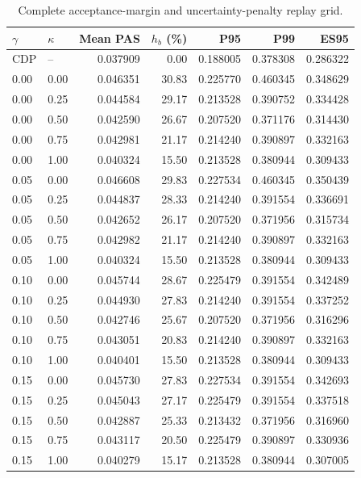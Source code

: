 \begin{table}[!htbp]\centering
\small
\caption{Complete acceptance-margin and uncertainty-penalty replay grid.}\label{tab:reliability_grid}
\begin{tabularx}{\linewidth}{YYrrrrr}\toprule
$\gamma$ & $\kappa$ & Mean PAS & $h_b$ (\%) & P95 & P99 & ES95\\\midrule
CDP & -- & 0.037909 & 0.00 & 0.188005 & 0.378308 & 0.286322\\
0.00 & 0.00 & 0.046351 & 30.83 & 0.225770 & 0.460345 & 0.348629\\
0.00 & 0.25 & 0.044584 & 29.17 & 0.213528 & 0.390752 & 0.334428\\
0.00 & 0.50 & 0.042590 & 26.67 & 0.207520 & 0.371176 & 0.314430\\
0.00 & 0.75 & 0.042981 & 21.17 & 0.214240 & 0.390897 & 0.332163\\
0.00 & 1.00 & 0.040324 & 15.50 & 0.213528 & 0.380944 & 0.309433\\
0.05 & 0.00 & 0.046608 & 29.83 & 0.227534 & 0.460345 & 0.350439\\
0.05 & 0.25 & 0.044837 & 28.33 & 0.214240 & 0.391554 & 0.336691\\
0.05 & 0.50 & 0.042652 & 26.17 & 0.207520 & 0.371956 & 0.315734\\
0.05 & 0.75 & 0.042982 & 21.17 & 0.214240 & 0.390897 & 0.332163\\
0.05 & 1.00 & 0.040324 & 15.50 & 0.213528 & 0.380944 & 0.309433\\
0.10 & 0.00 & 0.045744 & 28.67 & 0.225479 & 0.391554 & 0.342489\\
0.10 & 0.25 & 0.044930 & 27.83 & 0.214240 & 0.391554 & 0.337252\\
0.10 & 0.50 & 0.042746 & 25.67 & 0.207520 & 0.371956 & 0.316296\\
0.10 & 0.75 & 0.043051 & 20.83 & 0.214240 & 0.390897 & 0.332163\\
0.10 & 1.00 & 0.040401 & 15.50 & 0.213528 & 0.380944 & 0.309433\\
0.15 & 0.00 & 0.045730 & 27.83 & 0.227534 & 0.391554 & 0.342693\\
0.15 & 0.25 & 0.045043 & 27.17 & 0.225479 & 0.391554 & 0.337518\\
0.15 & 0.50 & 0.042887 & 25.33 & 0.213432 & 0.371956 & 0.316960\\
0.15 & 0.75 & 0.043117 & 20.50 & 0.225479 & 0.390897 & 0.330936\\
0.15 & 1.00 & 0.040279 & 15.17 & 0.213528 & 0.380944 & 0.307005\\

\end{tabularx}
\end{table}
